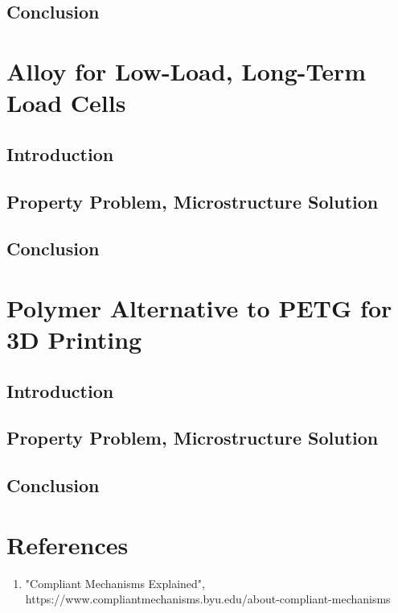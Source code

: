 \documentclass{homework}
\begin{document}
\subsection{Conclusion}

\section{Alloy for Low-Load, Long-Term Load Cells}

\subsection{Introduction}
\subsection{Property Problem, Microstructure Solution}
\subsection{Conclusion}

\section{Polymer Alternative to PETG for 3D Printing}

\subsection{Introduction}
\subsection{Property Problem, Microstructure Solution}
\subsection{Conclusion}

\section{References}

\begin{enumerate}
    \item "Compliant Mechanisms Explained", https://www.compliantmechanisms.byu.edu/about-compliant-mechanisms
\end{enumerate}
\end{document}
